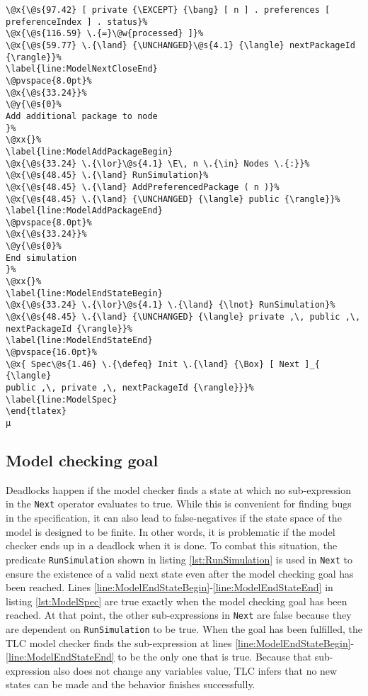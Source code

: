 \begin{lstlisting}[caption=System actor behavior in TLA\textsuperscript+ specification
    , label=lst:ModelSpec]
\@x{\@s{97.42} [ private {\EXCEPT} {\bang} [ n ] . preferences [
preferenceIndex ] . status}%
\@x{\@s{116.59} \.{=}\@w{processed} ]}%
\@x{\@s{59.77} \.{\land} {\UNCHANGED}\@s{4.1} {\langle} nextPackageId
{\rangle}}%
\label{line:ModelNextCloseEnd}
\@pvspace{8.0pt}%
\@x{\@s{33.24}}%
\@y{\@s{0}%
Add additional package to node
}%
\@xx{}%
\label{line:ModelAddPackageBegin}
\@x{\@s{33.24} \.{\lor}\@s{4.1} \E\, n \.{\in} Nodes \.{:}}%
\@x{\@s{48.45} \.{\land} RunSimulation}%
\@x{\@s{48.45} \.{\land} AddPreferencedPackage ( n )}%
\@x{\@s{48.45} \.{\land} {\UNCHANGED} {\langle} public {\rangle}}%
\label{line:ModelAddPackageEnd}
\@pvspace{8.0pt}%
\@x{\@s{33.24}}%
\@y{\@s{0}%
End simulation
}%
\@xx{}%
\label{line:ModelEndStateBegin}
\@x{\@s{33.24} \.{\lor}\@s{4.1} \.{\land} {\lnot} RunSimulation}%
\@x{\@s{48.45} \.{\land} {\UNCHANGED} {\langle} private ,\, public ,\,
nextPackageId {\rangle}}%
\label{line:ModelEndStateEnd}
\@pvspace{16.0pt}%
\@x{ Spec\@s{1.46} \.{\defeq} Init \.{\land} {\Box} [ Next ]_{ {\langle}
public ,\, private ,\, nextPackageId {\rangle}}}%
\label{line:ModelSpec}
\end{tlatex}
µ
\end{lstlisting}

\subsection{Model checking goal}
\label{subsec:ModelCheckingGoal}

Deadlocks happen if the model checker finds a state at which no sub-expression in the \texttt{Next} operator evaluates to true. While this is convenient for finding bugs in the specification, it can also lead to false-negatives if the state space of the model is designed to be finite. In other words, it is problematic if the model checker ends up in a deadlock when it is done. To combat this situation, the predicate \texttt{RunSimulation} shown in listing \ref{lst:RunSimulation} is used in \texttt{Next} to ensure the existence of a valid next state even after the model checking goal has been reached. Lines \ref{line:ModelEndStateBegin}-\ref{line:ModelEndStateEnd} in listing \ref{lst:ModelSpec} are true exactly when the model checking goal has been reached. At that point, the other sub-expressions in \texttt{Next} are false because they are dependent on \texttt{RunSimulation} to be true. When the goal has been fulfilled, the TLC model checker finds the sub-expression at lines \ref{line:ModelEndStateBegin}-\ref{line:ModelEndStateEnd} to be the only one that is true. Because that sub-expression also does not change any variables value, TLC infers that no new states can be made and the behavior finishes successfully.


